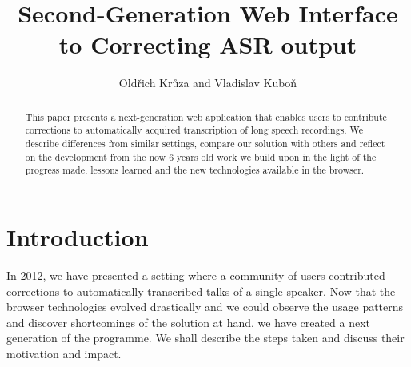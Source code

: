 \documentclass{svproc}
\begin{document}
\mainmatter              %
%
\title{Second-Generation Web Interface to Correcting ASR output}
%
%
\author{Old\v{r}ich Kr\r{u}za and Vladislav Kubo\v{n}}
%
%
%

\maketitle              %

\begin{abstract}
This paper presents a next-generation web application that enables users to
contribute corrections to automatically acquired transcription of long speech
recordings. We describe differences from similar settings, compare our solution
with others and reflect on the development from the now 6 years old work we
build upon in the light of the progress made, lessons learned and the new
technologies available in the browser.
\end{abstract}

\section{Introduction}

In 2012\cite{kruuza2012making}, we have presented a setting where a community of
users contributed corrections to automatically transcribed talks of a single
speaker. Now that the browser technologies evolved drastically and we could
observe the usage patterns and discover shortcomings of the solution at hand, we
have created a next generation of the programme. We shall describe the steps
taken and discuss their motivation and impact.
\end{document}
